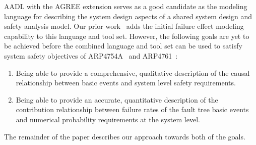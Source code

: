 AADL with the AGREE extension serves as a good candidate as the modeling language for describing the system design aspects of a shared system design and safety analysis model. Our prior work~\cite{Stewart17:IMBSA} adds the initial failure effect modeling capability to this language and tool set. However, the following goals are yet to be achieved before the combined language and tool set can be used to satisfy system safety objectives of ARP4754A~\cite{SAE:ARP4754A} and ARP4761~\cite{SAE:ARP4761}:

\begin{enumerate}
	\item Being able to provide a comprehensive, qualitative description of the causal relationship between basic events and system level safety requirements.
	\item Being able to provide an accurate, quantitative description of the contribution relationship between failure rates of the fault tree basic events and numerical probability requirements at the system level.
\end{enumerate}

The remainder of the paper describes our approach towards both of the goals.



